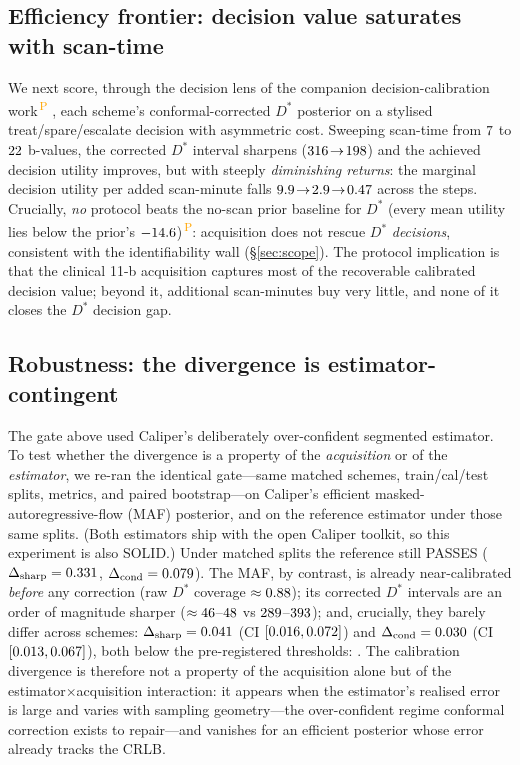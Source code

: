 \documentclass[11pt]{article}
\newcommand{\PROV}{\textsuperscript{\textcolor{orange}{\,P}}}
\newcommand{\Dstar}{D^{*}}
\begin{document}
\subsection{Efficiency frontier: decision value saturates with scan-time}
\label{sec:frontier}

We next score, through the decision lens of the companion decision-calibration
work\PROV{} \cite{minos2026}, each scheme's conformal-corrected $\Dstar$ posterior on a
stylised treat/spare/escalate decision with asymmetric cost. Sweeping scan-time from
$7$ to $22$ b-values, the corrected $\Dstar$ interval
sharpens ($316\!\to\!198$) and the achieved decision
utility improves, but with steeply \emph{diminishing returns}: the marginal decision
utility per added scan-minute falls $9.9\!\to\!2.9\!\to\!0.47$
across the steps. Crucially, \emph{no} protocol beats the no-scan prior baseline for
$\Dstar$ (every mean utility lies below the prior's $-14.6$)\PROV{}:
acquisition does not rescue $\Dstar$ \emph{decisions}, consistent with the
identifiability wall (\S\ref{sec:scope}). The protocol implication is that the
clinical 11-b acquisition captures most of the recoverable calibrated decision value;
beyond it, additional scan-minutes buy very little, and none of it closes the
$\Dstar$ decision gap.

\subsection{Robustness: the divergence is estimator-contingent}
\label{sec:maf}

The gate above used Caliper's deliberately over-confident segmented estimator. To test
whether the divergence is a property of the \emph{acquisition} or of the \emph{estimator},
we re-ran the identical gate---same matched schemes, train/cal/test splits, metrics, and
paired bootstrap---on Caliper's efficient masked-autoregressive-flow (MAF) posterior, and
on the reference estimator under those same splits. (Both estimators ship with the open
Caliper toolkit, so this experiment is also SOLID.) Under matched splits the reference
still PASSES ($\Delta_{\mathrm{sharp}}=0.331$,
$\Delta_{\mathrm{cond}}=0.079$). The MAF, by contrast, is already
near-calibrated \emph{before} any correction (raw $\Dstar$ coverage $\approx0.88$);
its corrected $\Dstar$ intervals are an order of magnitude sharper
($\approx46$--$48$ vs $289$--$393$); and,
crucially, they barely differ across schemes: $\Delta_{\mathrm{sharp}}=0.041$
(CI $[0.016,0.072]$) and $\Delta_{\mathrm{cond}}=0.030$
(CI $[0.013,0.067]$), both below the pre-registered thresholds:
\textbf{\numMafVerdict}. The calibration divergence is therefore not a property of the
acquisition alone but of the estimator$\times$acquisition interaction: it appears when the
estimator's realised error is large and varies with sampling geometry---the over-confident
regime conformal correction exists to repair---and vanishes for an efficient posterior whose
error already tracks the CRLB.
\end{document}
